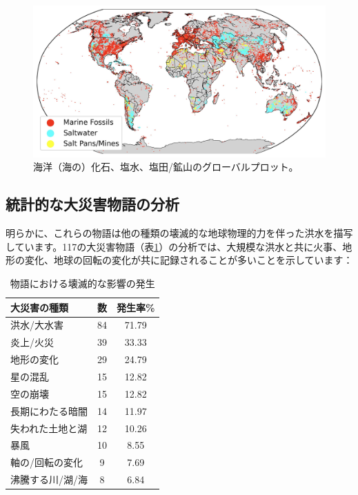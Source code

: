 \documentclass[10pt,twocolumn,letterpaper]{article}
\begin{document}
\begin{figure}[b]
\begin{center}
\includegraphics[width=1\textwidth]{marine.jpg}
\end{center}
   \caption{海洋（海の）化石、塩水、塩田/鉱山のグローバルプロット\cite{15,16,86,87}。}
   \label{fig:2}
\end{figure}

\subsection{統計的な大災害物語の分析}

明らかに、これらの物語は他の種類の壊滅的な地球物理的力を伴った洪水を描写しています。117の大災害物語（表\ref{tab: 1}）の分析では、大規模な洪水と共に火事、地形の変化、地球の回転の変化が共に記録されることが多いことを示しています\cite{14}：

\begin{table}[ht]
\begin{center}
\renewcommand{\arraystretch}{1.2}  %
\begin{tabular}{|l|c|c|}
\hline
\textbf{大災害の種類} & \textbf{数} & \textbf{発生率\%} \\
\hline\hline
洪水/大水害            & 84 & 71.79 \\
炎上/火災            & 39 & 33.33 \\
地形の変化           & 29 & 24.79 \\
星の混乱              & 15 & 12.82 \\
空の崩壊              & 15 & 12.82 \\
長期にわたる暗闇        & 14 & 11.97 \\
失われた土地と湖      & 12 & 10.26 \\
暴風                   & 10 & 8.55  \\
軸の/回転の変化      & 9  & 7.69  \\
沸騰する川/湖/海      & 8  & 6.84 \\
\hline
\end{tabular}
\end{center}
\caption{物語における壊滅的な影響の発生}
\label{tab: 1}
\end{table}
\end{document}
